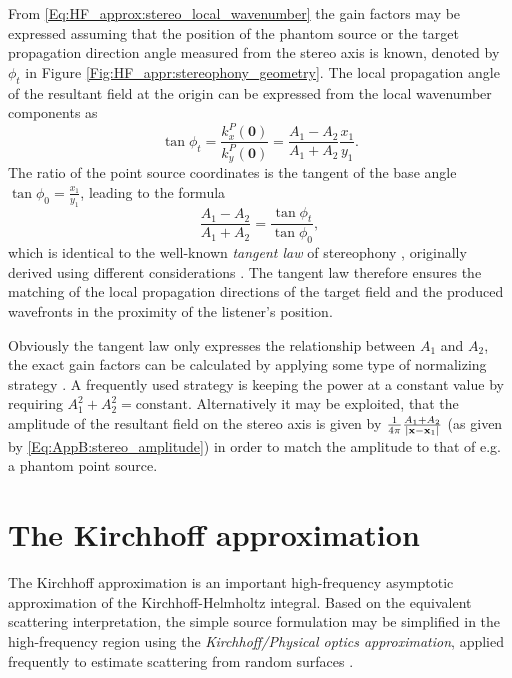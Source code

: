From \eqref{Eq:HF_approx:stereo_local_wavenumber} the gain factors may be expressed assuming that the position of the phantom source or the target propagation direction angle measured from the stereo axis is known, denoted by $\phi_t$ in Figure \eqref{Fig:HF_appr:stereophony_geometry}.
The local propagation angle of the resultant field at the origin can be expressed from the local wavenumber components as
\begin{equation}
\tan \phi_t = \frac{k_x^P(\mathbf{0})}{k_y^P(\mathbf{0})} = \frac{A_1-A_2}{A_1+A_2}\frac{x_1}{y_1}.
\end{equation}
The ratio of the point source coordinates is the tangent of the base angle $\tan \phi_0 = \frac{x_1}{y_1}$, leading to the formula
\begin{equation}
\frac{A_1 - A_2}{A_1 + A_2} = \frac{\tan \phi_t}{\tan \phi_0},
\end{equation}
which is identical to the well-known \emph{tangent law} of stereophony \cite{Pulkki1997, Pulkki2001:phd, SpringerHandbookSpeech2008, Pulkki2001a}, originally derived using different considerations \cite{Bennett1985}.
The tangent law therefore ensures the matching of the local propagation directions of the target field and the produced wavefronts in the proximity of the listener's position.

Obviously the tangent law only expresses the relationship between $A_1$ and $A_2$, the exact gain factors can be calculated by applying some type of normalizing strategy \cite{Moore1990}.
A frequently used strategy is keeping the power at a constant value by requiring $A_1^2 + A_2^2 = \text{constant}$.
Alternatively it may be exploited, that the amplitude of the resultant field on the stereo axis is given by $\frac{1}{4\pi}\frac{A_1+A_2}{|\mathbf{x}-\mathbf{x}_1|}$ (as given by \eqref{Eq:AppB:stereo_amplitude}) in order to match the amplitude to that of e.g. a phantom point source.

\section{The Kirchhoff approximation}

The Kirchhoff  approximation is an important high-frequency asymptotic approximation of the Kirchhoff-Helmholtz integral.
Based on the equivalent scattering interpretation, the simple source formulation may be simplified in the high-frequency region using the \emph{Kirchhoff/Physical optics approximation}, applied frequently to estimate scattering from random surfaces \cite{Voronich1999, Tsang2000}.

